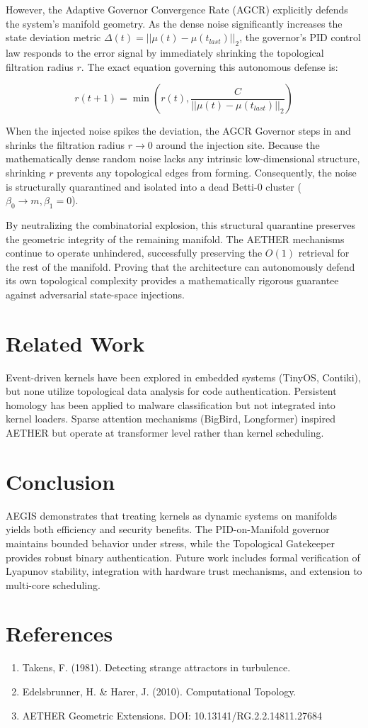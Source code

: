 \documentclass[conference]{IEEEtran}
\begin{document}
However, the Adaptive Governor Convergence Rate (AGCR) explicitly defends the system's manifold geometry. As the dense noise significantly increases the state deviation metric $\Delta(t) = ||\mu(t) - \mu(t_{last})||_2$, the governor's PID control law responds to the error signal by immediately shrinking the topological filtration radius $r$. The exact equation governing this autonomous defense is:

\begin{equation}
r(t+1) = \min\left( r(t), \frac{C}{||\mu(t) - \mu(t_{last})||_2} \right)
\end{equation}

When the injected noise spikes the deviation, the AGCR Governor steps in and shrinks the filtration radius $r \to 0$ around the injection site. Because the mathematically dense random noise lacks any intrinsic low-dimensional structure, shrinking $r$ prevents any topological edges from forming. Consequently, the noise is structurally quarantined and isolated into a dead Betti-0 cluster ($\beta_0 \to m, \beta_1 = 0$).

By neutralizing the combinatorial explosion, this structural quarantine preserves the geometric integrity of the remaining manifold. The AETHER mechanisms continue to operate unhindered, successfully preserving the $O(1)$ retrieval for the rest of the manifold. Proving that the architecture can autonomously defend its own topological complexity provides a mathematically rigorous guarantee against adversarial state-space injections.

\section{Related Work}

Event-driven kernels have been explored in embedded systems (TinyOS, Contiki), but none utilize topological data analysis for code authentication. Persistent homology has been applied to malware classification but not integrated into kernel loaders. Sparse attention mechanisms (BigBird, Longformer) inspired AETHER but operate at transformer level rather than kernel scheduling.

\section{Conclusion}

AEGIS demonstrates that treating kernels as dynamic systems on manifolds yields both efficiency and security benefits. The PID-on-Manifold governor maintains bounded behavior under stress, while the Topological Gatekeeper provides robust binary authentication. Future work includes formal verification of Lyapunov stability, integration with hardware trust mechanisms, and extension to multi-core scheduling.

\section*{References}

\begin{enumerate}
\item Takens, F. (1981). Detecting strange attractors in turbulence.
\item Edelsbrunner, H. \& Harer, J. (2010). Computational Topology.
\item AETHER Geometric Extensions. DOI: 10.13141/RG.2.2.14811.27684
\end{enumerate}
\end{document}
